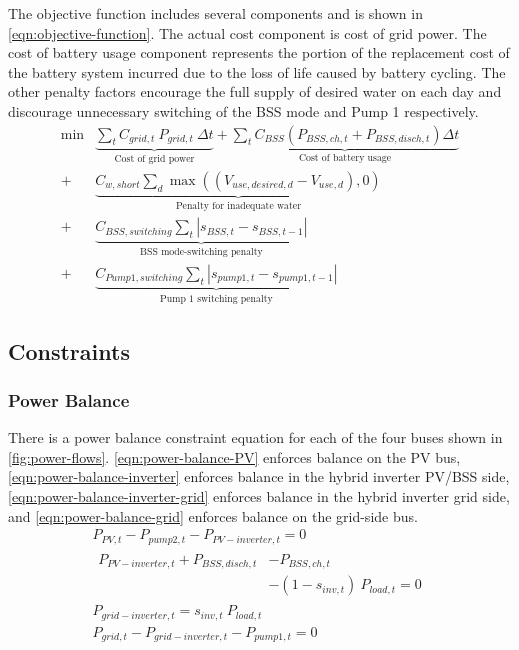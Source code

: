 The objective function includes several components and is shown in \autoref{eqn:objective-function}. The actual cost component is cost of grid power. The cost of battery usage component represents the portion of the replacement cost of the battery system incurred due to the loss of life caused by battery cycling. The other penalty factors encourage the full supply of desired water on each day and discourage unnecessary switching of the BSS mode and Pump 1 respectively.
%
\begin{equation}
\label{eqn:objective-function}
\begin{split}
\min &\underbrace{\sum_t C_{grid,t} \ P_{grid,t} \ \Delta t}_{\textrm{Cost of grid power}}
+ \underbrace{\sum_t C_{BSS} \left( P_{BSS,ch,t} + P_{BSS,disch,t} \right) \Delta t}_{\textrm{Cost of battery usage}}
\\
+ &\underbrace{C_{w,short} \sum_d \max\left(\left(V_{use,desired,d} - V_{use,d}\right), 0\right)}_{\textrm{Penalty for inadequate water}}
\\
+ &\underbrace{C_{BSS,switching} \sum_t \left| s_{BSS,t} - s_{BSS,t-1} \right|}_{\textrm{BSS mode-switching penalty}}
\\
+ &\underbrace{C_{Pump1,switching} \sum_t \left| s_{pump1,t} - s_{pump1,t-1} \right|}_{\textrm{Pump 1 switching penalty}}
\end{split}
\end{equation}


\subsection{Constraints}

\subsubsection{Power Balance}

There is a power balance constraint equation for each of the four buses shown in \autoref{fig:power-flows}. \autoref{eqn:power-balance-PV} enforces balance on the PV bus, \autoref{eqn:power-balance-inverter} enforces balance in the hybrid inverter PV/BSS side, \autoref{eqn:power-balance-inverter-grid} enforces balance in the hybrid inverter grid side, and \autoref{eqn:power-balance-grid} enforces balance on the grid-side bus.
%
\begin{gather}
\label{eqn:power-balance-PV}
P_{PV,t} - P_{pump2,t} - P_{PV-inverter,t} = 0 \\
\label{eqn:power-balance-inverter}
\begin{split}
P_{PV-inverter,t} + P_{BSS,disch,t}& - P_{BSS,ch,t} \\
 &- \left( 1 - s_{inv,t}\right) \ P_{load,t} = 0 
\end{split}
\\
\label{eqn:power-balance-inverter-grid}
P_{grid-inverter,t} = s_{inv,t} \ P_{load,t} \\
\label{eqn:power-balance-grid}
P_{grid,t} - P_{grid-inverter,t} - P_{pump1,t} = 0
\end{gather}

